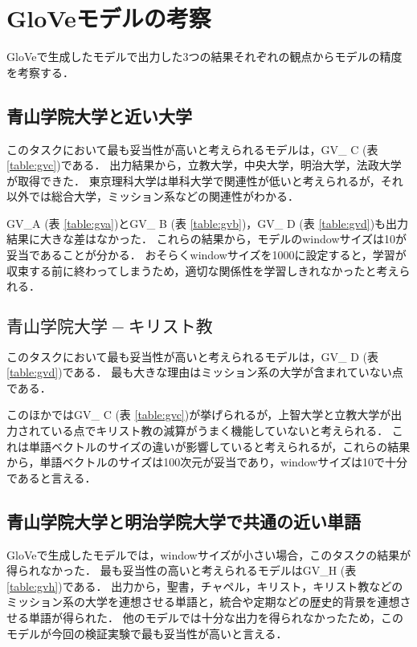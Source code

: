 \section{GloVeモデルの考察}
GloVeで生成したモデルで出力した3つの結果それぞれの観点からモデルの精度を考察する．

\subsection{青山学院大学と近い大学}
このタスクにおいて最も妥当性が高いと考えられるモデルは，GV\_ C (表 \ref{table:gvc})である．
出力結果から，立教大学，中央大学，明治大学，法政大学が取得できた．
東京理科大学は単科大学で関連性が低いと考えられるが，それ以外では総合大学，ミッション系などの関連性がわかる．

GV\_A (表 \ref{table:gva})とGV\_ B (表 \ref{table:gvb})，GV\_ D (表 \ref{table:gvd})も出力結果に大きな差はなかった．
これらの結果から，モデルのwindowサイズは10が妥当であることが分かる．
おそらくwindowサイズを1000に設定すると，学習が収束する前に終わってしまうため，適切な関係性を学習しきれなかったと考えられる．

\subsection{$ 青山学院大学 - キリスト教 $}
このタスクにおいて最も妥当性が高いと考えられるモデルは，GV\_ D (表 \ref{table:gvd})である．
最も大きな理由はミッション系の大学が含まれていない点である．

このほかではGV\_ C (表 \ref{table:gvc})が挙げられるが，上智大学と立教大学が出力されている点でキリスト教の減算がうまく機能していないと考えられる．
これは単語ベクトルのサイズの違いが影響していると考えられるが，これらの結果から，単語ベクトルのサイズは100次元が妥当であり，windowサイズは10で十分であると言える．

\subsection{青山学院大学と明治学院大学で共通の近い単語}
GloVeで生成したモデルでは，windowサイズが小さい場合，このタスクの結果が得られなかった．
最も妥当性の高いと考えられるモデルはGV\_H (表 \ref{table:gvh})である．
出力から，聖書，チャペル，キリスト，キリスト教などのミッション系の大学を連想させる単語と，統合や定期などの歴史的背景を連想させる単語が得られた．
他のモデルでは十分な出力を得られなかったため，このモデルが今回の検証実験で最も妥当性が高いと言える．

